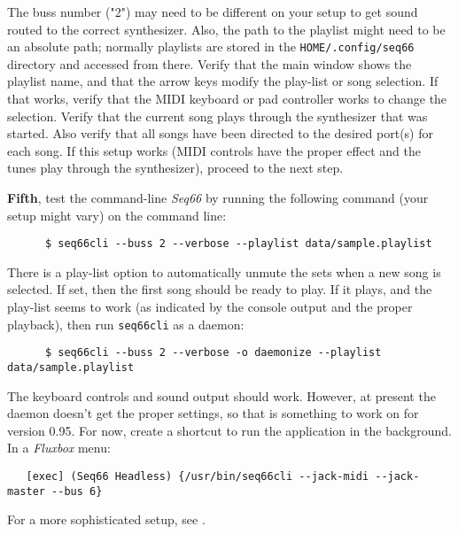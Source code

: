 
   The buss number ("2") may need to be different on your setup to get sound
   routed to the correct synthesizer.  Also, the path to the playlist might
   need to be an absolute path; normally playlists are stored in the
   \texttt{HOME/.config/seq66} directory and accessed from there.
   Verify that the main window shows the playlist name, and that the arrow keys
   modify the play-list or song selection.  If that works, verify that the MIDI
   keyboard or pad controller works to change the selection.
   Verify that the current song plays through the synthesizer that was started.
   Also verify that all songs have been directed to the desired port(s) for
   each song.
   If this setup works (MIDI controls have the proper effect and the tunes play
   through the synthesizer), proceed to the next step.

   \textbf{Fifth}, test the command-line \textsl{Seq66} by running the
   following command (your setup might vary) on the command line:

   \begin{verbatim}
      $ seq66cli --buss 2 --verbose --playlist data/sample.playlist
   \end{verbatim}

   There is a play-list option to automatically unmute the sets when a new song
   is selected.  If set, then the first song should be ready to play.
   If it plays, and the play-list seems to work (as indicated by the console
   output and the proper playback), then run \texttt{seq66cli} as a daemon:

   \begin{verbatim}
      $ seq66cli --buss 2 --verbose -o daemonize --playlist data/sample.playlist
   \end{verbatim}

   The keyboard controls and sound output should work.
   However, at present the daemon doesn't get the proper settings, so that is
   something to work on for version 0.95.
   For now, create a shortcut to run the application in the background.
   In a \textsl{Fluxbox} menu:

   \begin{verbatim}
   [exec] (Seq66 Headless) {/usr/bin/seq66cli --jack-midi --jack-master --bus 6}
   \end{verbatim}

   For a more sophisticated setup, see .

